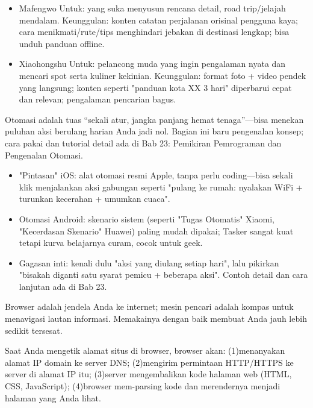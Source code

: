 \begin{itemize}
  \item Mafengwo Untuk: yang suka menyusun rencana detail, road trip/jelajah mendalam. Keunggulan: konten catatan perjalanan orisinal pengguna kaya; cara menikmati/rute/tips menghindari jebakan di destinasi lengkap; bisa unduh panduan offline.
  \item Xiaohongshu Untuk: pelancong muda yang ingin pengalaman nyata dan mencari spot serta kuliner kekinian. Keunggulan: format foto + video pendek yang langsung; konten seperti "panduan kota XX 3 hari" diperbarui cepat dan relevan; pengalaman pencarian bagus.
\end{itemize}


Otomasi adalah tuas “sekali atur, jangka panjang hemat tenaga”—bisa menekan puluhan aksi berulang harian Anda jadi nol. Bagian ini baru pengenalan konsep; cara pakai dan tutorial detail ada di Bab 23: Pemikiran Pemrograman dan Pengenalan Otomasi.

\begin{itemize}
  \item "Pintasan" iOS: alat otomasi resmi Apple, tanpa perlu coding—bisa sekali klik menjalankan aksi gabungan seperti "pulang ke rumah: nyalakan WiFi + turunkan kecerahan + umumkan cuaca".
  \item Otomasi Android: skenario sistem (seperti "Tugas Otomatis" Xiaomi, "Kecerdasan Skenario" Huawei) paling mudah dipakai; Tasker sangat kuat tetapi kurva belajarnya curam, cocok untuk geek.
  \item Gagasan inti: kenali dulu "aksi yang diulang setiap hari", lalu pikirkan "bisakah diganti satu syarat pemicu + beberapa aksi". Contoh detail dan cara lanjutan ada di Bab 23.
\end{itemize}


Browser adalah jendela Anda ke internet; mesin pencari adalah kompas untuk menavigasi lautan informasi. Memakainya dengan baik membuat Anda jauh lebih sedikit tersesat.


Saat Anda mengetik alamat situs di browser, browser akan: (1)menanyakan alamat IP domain ke server DNS; (2)mengirim permintaan HTTP/HTTPS ke server di alamat IP itu; (3)server mengembalikan kode halaman web (HTML, CSS, JavaScript); (4)browser mem-parsing kode dan merendernya menjadi halaman yang Anda lihat.

